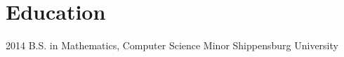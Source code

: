 \documentclass[]{cv-style}          %
\begin{document}

\section{Education}

\begin{entrylist}
\entry
{2014}
{B.S. {\normalfont in Mathematics, Computer Science Minor}}
{Shippensburg University}
{\vspace{-0.3cm}}
\end{entrylist}
\end{document}

